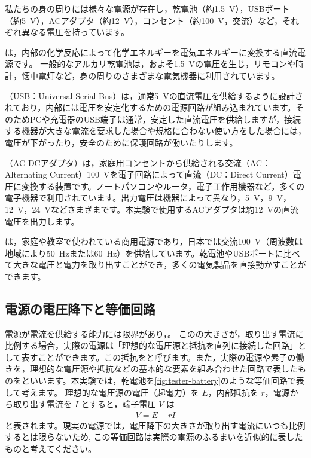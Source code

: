 私たちの身の周りには様々な電源が存在し，乾電池（約\SI{1.5}{V}），USBポート（約\SI{5}{V}），ACアダプタ（約\SI{12}{V}），コンセント（約\SI{100}{V}，交流）など，それぞれ異なる電圧を持っています。

は，内部の化学反応によって化学エネルギーを電気エネルギーに変換する直流電源です。
一般的なアルカリ乾電池は，およそ\SI{1.5}{V}の電圧を生じ，リモコンや時計，懐中電灯など，身の周りのさまざまな電気機器に利用されています。

（USB：Universal Serial Bus）は，通常\SI{5}{V}の直流電圧を供給するように設計されており，内部には電圧を安定化するための電源回路が組み込まれています。そのためPCや充電器のUSB端子は通常，安定した直流電圧を供給しますが，接続する機器が大きな電流を要求した場合や規格に合わない使い方をした場合には，電圧が下がったり，安全のために保護回路が働いたりします。

（AC-DCアダプタ）は，家庭用コンセントから供給される交流（AC：Alternating Current）\SI{100}{V}を電子回路によって直流（DC：Direct Current）電圧に変換する装置です。ノートパソコンやルータ，電子工作用機器など，多くの電子機器で利用されています。出力電圧は機器によって異なり，\SI{5}{V}，\SI{9}{V}，\SI{12}{V}，\SI{24}{V}などさまざまです。本実験で使用するACアダプタは約\SI{12}{V}の直流電圧を出力します。

は，家庭や教室で使われている商用電源であり，日本では交流\SI{100}{V}（周波数は地域により\SI{50}{Hz}または\SI{60}{Hz}）を供給しています。乾電池やUSBポートに比べて大きな電圧と電力を取り出すことができ，多くの電気製品を直接動かすことができます。

\subsection{電源の電圧降下と等価回路}
\label{sec:tester-voltage-drop}

電源が電流を供給する能力には限界があり，。
このの大きさが，取り出す電流に比例する場合，実際の電源は「理想的な電圧源と抵抗を直列に接続した回路」として表すことができます。この抵抗をと呼びます。また，実際の電源や素子の働きを，理想的な電圧源や抵抗などの基本的な要素を組み合わせた回路で表したものをといいます。本実験では，乾電池を\cref{fig:tester-battery}のような等価回路で表して考えます。
理想的な電圧源の電圧（起電力）を $E$，内部抵抗を $r$，電源から取り出す電流を $I$ とすると，端子電圧 $V$ は
\begin{align}
V = E - rI
\label{eq:tester-terminal}
\end{align}
と表されます。現実の電源では，電圧降下の大きさが取り出す電流にいつも比例するとは限らないため, この等価回路は実際の電源のふるまいを近似的に表したものと考えてください。

